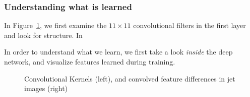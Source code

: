 \subsubsection{Understanding what is learned} %
\label{ssub:understanding_what_is_learned}

In Figure~\ref{fig:convkernels}, we first examine the $11\times11$ convolutional filters in the first layer and look for structure. In

In order to understand what we learn, we first take a look \emph{inside} the deep network, and visualize features learned during training.

\begin{figure}[bt]
  \begin{center}
      \caption{Convolutional Kernels (left), and convolved feature differences in jet images (right)}
      \label{fig:convkernels}

    \end{center}
\end{figure}

